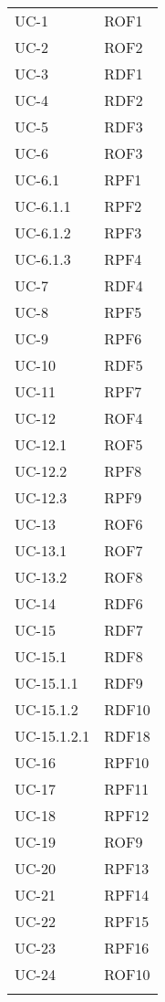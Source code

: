 \begin{longtable}{| p{5cm} | p{5cm} |}
		UC-1 & ROF1  \\
		\rowcolor{LightGray}
		UC-2 & ROF2 \\
		UC-3 & RDF1 \\
		\rowcolor{LightGray}
		UC-4 & RDF2 \\
		UC-5 & RDF3 \\
		\rowcolor{LightGray}
		UC-6 & ROF3 \\
		UC-6.1 & RPF1 \\
		\rowcolor{LightGray}
		UC-6.1.1 & RPF2 \\
		UC-6.1.2 & RPF3 \\
		\rowcolor{LightGray}
		UC-6.1.3 & RPF4 \\
		UC-7 & RDF4 \\
		\rowcolor{LightGray}
		UC-8 & RPF5 \\
		UC-9 & RPF6 \\
		\rowcolor{LightGray}
		UC-10 & RDF5 \\
		UC-11 & RPF7 \\
		\rowcolor{LightGray}
		UC-12 & ROF4 \\
		UC-12.1 & ROF5 \\
		\rowcolor{LightGray}
		UC-12.2 & RPF8 \\
		UC-12.3 & RPF9 \\
		\rowcolor{LightGray}
		UC-13 & ROF6 \\
		UC-13.1 & ROF7 \\
		\rowcolor{LightGray}
		UC-13.2 & ROF8 \\
		UC-14 & RDF6\\
		\rowcolor{LightGray}
		UC-15 & RDF7 \\
		UC-15.1 & RDF8\\
		\rowcolor{LightGray}
		UC-15.1.1 & RDF9\\
		UC-15.1.2 & RDF10\\
		\rowcolor{LightGray}
		UC-15.1.2.1 & RDF18\\
		UC-16 & RPF10\\
		\rowcolor{LightGray}
		UC-17 & RPF11\\
		UC-18 & RPF12 \\
		\rowcolor{LightGray}
		UC-19 & ROF9 \\
		UC-20 & RPF13 \\
		\rowcolor{LightGray}
		UC-21 & RPF14 \\
		UC-22 & RPF15 \\ 
		\rowcolor{LightGray}
		UC-23 & RPF16\\
		UC-24 & ROF10 \\
		\rowcolor{LightGray}

\end{longtable}
